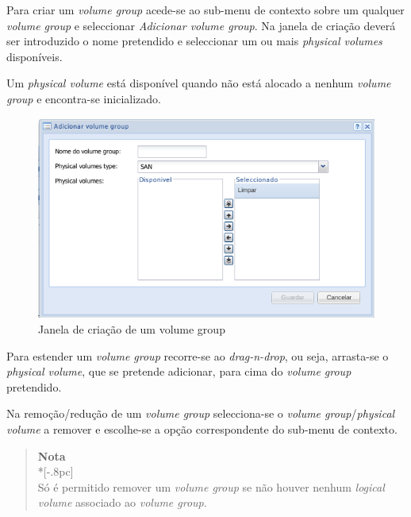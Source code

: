 Para criar um \emph{volume group} acede-se ao sub-menu de contexto sobre um qualquer \emph{volume group} e seleccionar \emph{Adicionar volume group}.
Na janela de criação deverá ser introduzido o nome pretendido e seleccionar um ou mais \emph{physical volumes} disponíveis.

Um \emph{physical volume} está disponível quando não está alocado a nenhum \emph{volume group} e encontra-se inicializado.

\begin{figure}[H]
        \begin{center}
        \includegraphics[scale=0.5]{screenshots/storage_vg_create.png}
        \caption{Janela de criação de um volume group}
        \label{fig:storage_vg_create}
        \end{center}
\end{figure}

Para estender um \emph{volume group} recorre-se ao \emph{drag-n-drop}, ou seja, arrasta-se o \emph{physical volume}, que se pretende adicionar, para cima do \emph{volume group} pretendido.

Na remoção/redução de um \emph{volume group} selecciona-se o \emph{volume group}/\emph{physical volume} a remover e escolhe-se a opção correspondente do sub-menu de contexto.
\begin{quote}
	{\large \bf Nota} \\*[-.8pc]
	\underline{\hspace{6in}} \\
	Só é permitido remover um \emph{volume group} se não houver nenhum \emph{logical volume} associado ao \emph{volume group}.
\end{quote}
 
